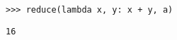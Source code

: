 \begin{blocksection}
\begin{lstlisting}
>>> reduce(lambda x, y: x + y, a)
\end{lstlisting}

\begin{solution}[0.25in]
    \begin{lstlisting}
16
    \end{lstlisting}
\end{solution}
\end{blocksection}





